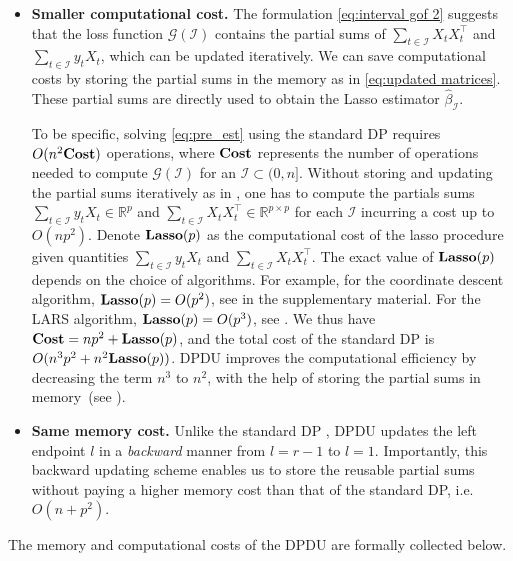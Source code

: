 \documentclass[11pt]{article}
\newcommand{\I}{{\mathcal I }}
\theoremstyle{plain}
\theoremstyle{definition}
\begin{document}
\begin{itemize}
    \item \textbf{Smaller computational cost.} The formulation \eqref{eq:interval gof 2} suggests that the loss function $\mathcal{G}(\mathcal{I})$ contains the partial sums of $\sum_{t \in \mathcal I} X_tX_t^{\top}$ and $\sum_{t \in \mathcal I} y_t X_t$, which can be updated iteratively. We can save computational costs by storing the partial sums in the memory as in \eqref{eq:updated matrices}.  These partial sums are directly used to obtain the Lasso estimator $\widehat \beta_{\I}$.
    
    To be specific, solving \eqref{eq:pre_est} using the standard DP requires $O(n^2{\bf Cost})$ operations, where ${\bf Cost}$ represents the number of operations needed to compute $\mathcal G(\mathcal I)$ for an $\mathcal I \subset (0,n]$. Without storing and updating the partial sums iteratively as in , one has to compute the partials sums $\sum_{t \in \mathcal I} y_t X_t \in \mathbb{R}^p$ and $\sum_{t \in \mathcal I} X_t X_t^\top \in \mathbb R^{p\times p}$ for each $\mathcal{I}$ incurring a cost up to $O(np^2)$. Denote ${\bf{Lasso}}(p)$ as the computational cost of the lasso procedure given quantities $\sum_{t \in \mathcal I} y_t X_t$ and $\sum_{t \in \mathcal I} X_t X_t^\top$.  The exact value of ${\bf{Lasso}}(p)$ depends on the choice of algorithms.  For example, for the coordinate descent algorithm, ${\bf{Lasso}} (p) =O(p^2)$, see  in the supplementary material. For the LARS algorithm, ${\bf{Lasso}} (p)  = O(p^3)$, see \cite{efron2004least}.  We thus have ${\bf Cost} = np^2 + {\bf{Lasso}}(p)$, and the total cost of the standard DP is $O(n^3p^2 + n^2{\bf Lasso}(p))$. DPDU improves the computational efficiency by decreasing the term $n^3$ to $n^2$, with the help of storing the partial sums in memory~(see ).  

    \item \textbf{Same memory cost.}  Unlike the standard DP \citep[e.g.][]{rinaldo2021localizing}, DPDU updates the left endpoint $l$ in a \textit{backward} manner from $l=r-1$ to $l=1$. Importantly, this backward updating scheme enables us to store the reusable partial sums without paying a higher memory cost than that of the standard DP, i.e.~$O(n+p^2)$.
\end{itemize}

The memory and computational costs of the DPDU are formally collected below.
\end{document}
